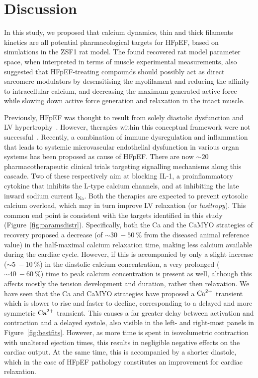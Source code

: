 %
%
%
\section{Discussion}\label{sec:ch7discussion}

\noindent
In this study, we proposed that calcium dynamics, thin and thick filaments kinetics are all potential pharmacological targets for HFpEF, based on simulations in the ZSF1 rat model. The found recovered rat model parameter space, when interpreted in terms of muscle experimental measurements, also suggested that HFpEF-treating compounds should possibly act as direct sarcomere modulators by desensitising the myofilament and reducing the affinity to intracellular calcium, and decreasing the maximum generated active force while slowing down active force generation and relaxation in the intact muscle.

Previously, HFpEF was thought to result from solely diastolic dysfunction and LV hypertrophy~\cite{Patel:2019}. However, therapies within this conceptual framework were not successful~\cite{Cleland:2014}. Recently, a combination of immune dysregulation and inflammation that leads to systemic microvascular endothelial dysfunction in various organ systems has been proposed as cause of HFpEF. There are now $\sim 20$ pharmacotherapeutic clinical trials targeting signalling mechanisms along this cascade. Two of these respectively aim at blocking IL-1, a proinflammatory cytokine that inhibits the L-type calcium channels, and at inhibiting the late inward sodium current $\text{I}_{\text{Na}}$. Both the therapies are expected to prevent cytosolic calcium overload, which may in turn improve LV relaxation (or \textit{lusitropy}). This common end point is consistent with the targets identified in this study (Figure~\ref{fig:paramsdistr}). Specifically, both the Ca and the CaMYO strategies of recovery proposed a decrease (of $\sim\SI{30}{}-\SI{50}{\percent}$ from the diseased animal reference value) in the half-maximal calcium relaxation time, making less calcium available during the cardiac cycle. However, if this is accompanied by only a slight increase ($\sim\SI{5}{}-\SI{10}{\percent}$) in the diastolic calcium concentration, a very prolonged ($\sim\SI{40}{}-\SI{60}{\percent}$) time to peak calcium concentration is present as well, although this affects mostly the tension development and duration, rather then relaxation. We have seen that the Ca and CaMYO strategies have proposed a $\textrm{Ca}^{2+}$ transient which is slower to rise and faster to decline, corresponding to a delayed and more symmetric $\textrm{Ca}^{2+}$ transient. This causes a far greater delay between activation and contraction and a delayed systole, also visible in the left- and right-most panels in Figure~\ref{fig:bestfits}. However, as more time is spent in isovolumetric contraction with unaltered ejection times, this results in negligible negative effects on the cardiac output. At the same time, this is accompanied by a shorter diastole, which in the case of HFpEF pathology constitutes an improvement for cardiac relaxation.

